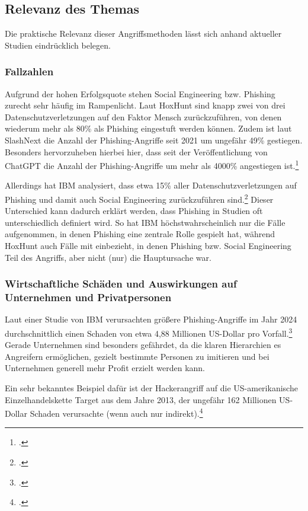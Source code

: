 \documentclass[12pt, a4paper, oneside]{scrartcl}
\begin{document}
\subsection{Relevanz des Themas}
Die praktische Relevanz dieser Angriffsmethoden lässt sich anhand aktueller Studien eindrücklich belegen.
\subsubsection{Fallzahlen}
Aufgrund der hohen Erfolgsquote stehen Social Engineering bzw. Phishing zurecht sehr häufig im Rampenlicht. 
Laut HoxHunt sind knapp zwei von drei 
Datenschutzverletzungen auf den Faktor Mensch zurückzuführen, von denen wiederum mehr als 80\%
als Phishing eingestuft werden können. Zudem ist laut SlashNext die Anzahl der Phishing-Angriffe
seit 2021 um ungefähr 49\% gestiegen. Besonders hervorzuheben hierbei hier, dass seit der Veröffentlichung
von ChatGPT die Anzahl der Phishing-Angriffe um mehr als 4000\% angestiegen ist.\footcite{HoxHunt_Report}
\par
Allerdings hat IBM analysiert, dass etwa 15\% aller Datenschutzverletzungen auf Phishing und
damit auch Social Engineering zurückzuführen sind.\footcite{IBM_Report}
Dieser Unterschied kann dadurch erklärt werden, dass Phishing in Studien oft unterschiedlich
definiert wird. So hat IBM höchstwahrscheinlich nur die Fälle aufgenommen, in denen 
Phishing eine zentrale Rolle gespielt hat, während HoxHunt auch Fälle mit einbezieht,
in denen Phishing bzw. Social Engineering Teil des Angriffs, aber nicht (nur) die Hauptursache war.

\subsubsection{Wirtschaftliche Schäden und Auswirkungen auf Unternehmen und Privatpersonen}
Laut einer Studie von IBM verursachten größere Phishing-Angriffe im Jahr 2024 durchschnittlich 
einen Schaden von etwa 4,88 Millionen US-Dollar pro Vorfall.\footcite{IBM_Phishing}
Gerade Unternehmen sind besonders gefährdet, da die klaren Hierarchien es Angreifern ermöglichen, 
gezielt bestimmte Personen zu imitieren und bei Unternehmen generell mehr Profit erzielt werden kann.
\par
Ein sehr bekanntes Beispiel dafür ist der Hackerangriff auf die US-amerikanische Einzelhandelskette Target 
aus dem Jahre 2013, der ungefähr 162 Millionen US-Dollar Schaden verursachte (wenn auch nur indirekt).\footcite{Target_Breach}\\
\end{document}
